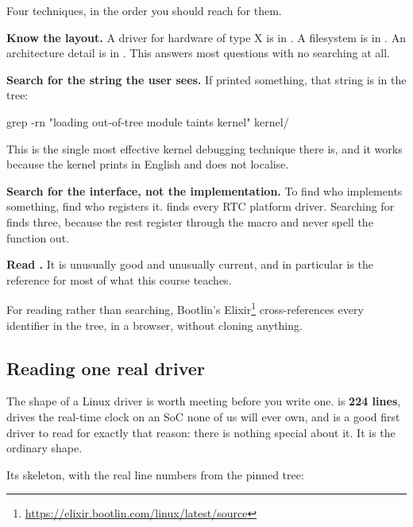 Four techniques, in the order you should reach for them.

\textbf{Know the layout.} A driver for hardware of type X is in . A filesystem is
in . An architecture detail is in . This answers most questions
with no searching at all.

\textbf{Search for the string the user sees.} If  printed something, that string is in
the tree:

\begin{shell}
grep -rn "loading out-of-tree module taints kernel" kernel/
\end{shell}

\noindent This is the single most effective kernel debugging technique there is, and it works
because the kernel prints in English and does not localise.

\textbf{Search for the interface, not the implementation.} To find who implements something, find
who registers it.  finds every RTC platform
driver. Searching for  finds three, because the rest register
through the  macro and never spell the function out.

\textbf{Read .} It is unusually good and unusually current, and
 in particular is the reference for most of what this course
teaches.

For reading rather than searching, Bootlin's
Elixir\footnote{\url{https://elixir.bootlin.com/linux/latest/source}} cross-references every
identifier in the tree, in a browser, without cloning anything.

\subsection{Reading one real driver}
\label{c3:app:a6}

The shape of a Linux driver is worth meeting before you write one.
 is \textbf{224 lines}, drives the real-time clock on an SoC none
of us will ever own, and is a good first driver to read for exactly that reason: there is nothing
special about it. It is the ordinary shape.

Its skeleton, with the real line numbers from the pinned tree:

